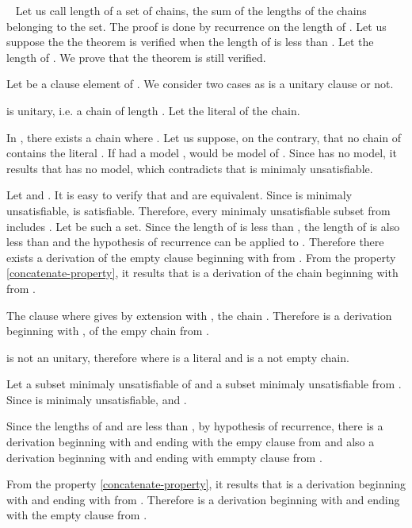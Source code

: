\documentclass{article}
\newenvironment{preuve}{\noindent {\em Proof :}\ }{{\hfill
    }\vspace{.5pc}} \newcommand{\sg}{\!\!<\!\!}
\begin{document}
\begin{preuve}
Let us call length of a set of chains, the sum of the lengths of the chains belonging to the set. The proof is done by 
recurrence on the length of . Let us suppose the the theorem is verified when the length of  is less than .
Let  the length of . We prove that the theorem is still verified.

Let  be a clause element of . We consider two cases as  is a unitary clause or not.
\begin{itemrond}
\item  is unitary, i.e. a chain of length . Let  the literal of the chain.

In , there exists a chain  where . Let us suppose, on the contrary, that no chain of 
contains the literal .  If   had a model ,  would be model of .
Since  has no model, it results that  has no model, which contradicts that  is minimaly 
unsatisfiable.

Let  and . It is easy to verify that  and  are equivalent.
Since  is minimaly unsatisfiable,  is satisfiable. Therefore,  every minimaly unsatisfiable
subset from  includes . Let  be such a set. Since the length of  is less than , the length of
 is also less than  and the hypothesis of recurrence can be applied to .
Therefore there exists a derivation  of the empty clause beginning with  from .
From the property \ref{concatenate-property}, it results that  is a derivation of the chain  beginning
with  from .

The clause  where  gives by extension with , the chain . Therefore  is a derivation
beginning with , of the empy chain from .

\item  is not an unitary, therefore  where  is a literal and  is a not empty chain.

Let  a subset minimaly unsatisfiable of  and  a subset minimaly unsatisfiable
from . Since  is minimaly unsatisfiable,  and .

Since the lengths of  and  are less than , by hypothesis of recurrence, there is a derivation 
 beginning with  and ending with the empy clause from  
and also a derivation  beginning with 
and ending with emmpty clause from .

From the property \ref{concatenate-property}, it results that  is a derivation beginning with 
and ending with  from . Therefore  is a derivation beginning with  and
ending with the empty clause from .

\end{itemrond}

\end{preuve}
\end{document}
